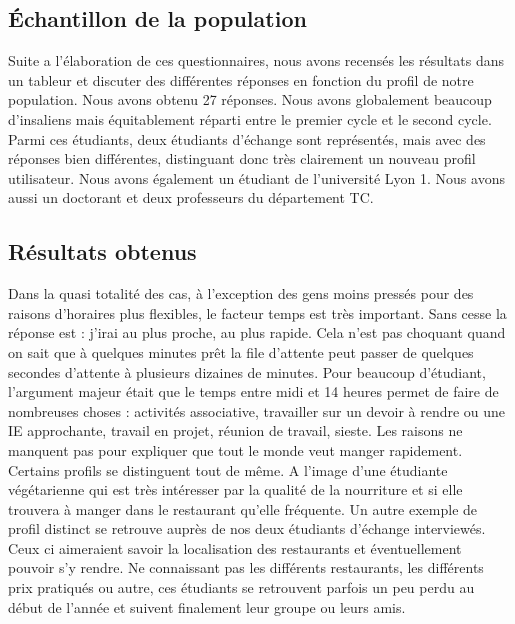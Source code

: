 \subsection{Échantillon de la population}
Suite a l’élaboration de ces questionnaires, nous avons recensés 
les résultats dans un tableur et discuter des différentes réponses en 
fonction du profil de notre population. Nous avons obtenu 27 réponses. 
Nous avons globalement beaucoup d’insaliens mais équitablement réparti
entre le premier cycle et le second cycle. Parmi ces étudiants, deux
étudiants d’échange sont représentés, mais avec des réponses bien
différentes, distinguant donc très clairement un nouveau profil utilisateur. 
Nous avons également un étudiant de l’université Lyon 1. Nous avons aussi
un doctorant et deux professeurs du département TC. 

\subsection{Résultats obtenus}
Dans la quasi totalité des cas, à l’exception des gens moins pressés 
pour des raisons d'horaires plus flexibles, le facteur temps est très important.
Sans cesse la réponse est : j’irai au plus proche, au plus rapide. Cela
n’est pas choquant quand on sait que à quelques minutes prêt la file
d’attente peut passer de quelques secondes d’attente à plusieurs
dizaines de minutes. Pour beaucoup d’étudiant, l’argument majeur était que 
le temps entre midi et 14 heures permet de faire de nombreuses choses : 
activités associative, travailler sur un devoir à rendre ou une IE approchante,
travail en projet, réunion de travail, sieste. Les raisons ne manquent pas 
pour expliquer que tout le monde veut manger rapidement. Certains profils
se distinguent tout de même. A l’image d’une étudiante végétarienne qui 
est très intéresser par la qualité de la nourriture et si elle trouvera à manger 
dans le restaurant qu’elle fréquente. Un autre exemple de profil distinct se
retrouve auprès de nos deux étudiants d’échange interviewés. Ceux ci
aimeraient savoir la localisation des restaurants et éventuellement pouvoir
s’y rendre. Ne connaissant pas les différents restaurants, les différents prix
pratiqués ou autre, ces étudiants se retrouvent parfois un peu perdu au
début de l’année et suivent finalement leur groupe ou leurs amis.

